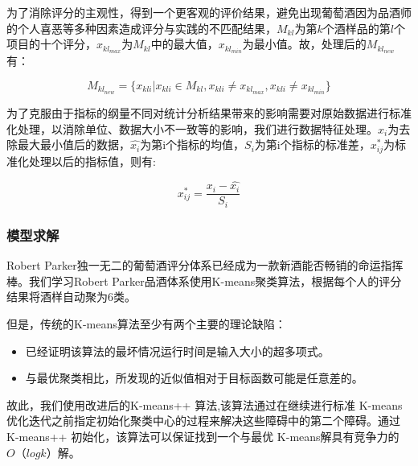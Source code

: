 \documentclass[UTF8]{ctexart}
\begin{document}
\begin{itemize}
	      为了消除评分的主观性，得到一个更客观的评价结果，避免出现葡萄酒因为品酒师的个人喜恶等多种因素造成评分与实践的不匹配结果，$M_{kl}$为第$k$个酒样品的第$l$个项目的十个评分，$x_{kl_{max}}$为$M_{kl}$中的最大值，$x_{kl_{min}}$为最小值。故，处理后的$M_{kl_{new}}$有：

	      \begin{equation}
		      M_{kl_{new}}=\{x_{kli}| x_{kli} ∈ M_{kl} , x_{kli}\neq x_{kl_{max}}, x_{kli} \neq x_{kl_{min}}\}
	      \end{equation}

	      为了克服由于指标的纲量不同对统计分析结果带来的影响需要对原始数据进行标准化处理，以消除单位、数据大小不一致等的影响，我们进行数据特征处理。$x_i$为去除最大最小值后的数据，$\hat{x_i}$为第i个指标的均值，$S_i$为第i个指标的标准差，$x^*_{ij}$为标准化处理以后的指标值，则有:

	      \begin{equation}
		      x^*_{ij}=\frac{x_i-\hat{x_i}}{S_i}
	      \end{equation}

\end{itemize}

\subsubsection{模型求解}
Robert Parker独一无二的葡萄酒评分体系已经成为一款新酒能否畅销的命运指挥棒。我们学习Robert Parker品酒体系使用K-means聚类算法，根据每个人的评分结果将酒样自动聚为6类。

但是，传统的K-means算法至少有两个主要的理论缺陷：
\begin{itemize}
	\item 已经证明该算法的最坏情况运行时间是输入大小的超多项式\cite{arthur2006slow}。
	\item 与最优聚类相比，所发现的近似值相对于目标函数可能是任意差的。
\end{itemize}

故此，我们使用改进后的K-means++ 算法,该算法通过在继续进行标准 K-means优化迭代之前指定初始化聚类中心的过程来解决这些障碍中的第二个障碍。通过 K-means++ 初始化，该算法可以保证找到一个与最优 K-means解具有竞争力的$ O（log k）$解。
\end{document}
